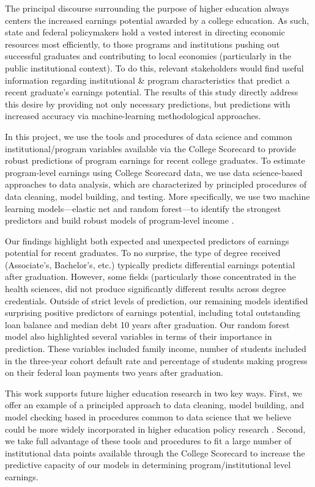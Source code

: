 \documentclass[a4paper, 12pt]{article}
\begin{document}
The principal discourse surrounding the purpose of higher education always centers the increased earnings potential awarded by a college education. As such, state and federal policymakers hold a vested interest in directing economic resources most efficiently, to those programs and institutions pushing out successful graduates and contributing to local economies (particularly in the public institutional context). To do this, relevant stakeholders would find useful information regarding institutional \& program characteristics that  predict a recent graduate's earnings potential. The results of this study directly address this desire by providing not only necessary predictions, but predictions with increased accuracy via machine-learning methodological approaches. 

In this project, we use the tools and procedures of data science and common institutional/program variables available via the College Scorecard to provide robust predictions of program earnings for recent college graduates. To estimate program-level earnings using College Scorecard data, we use data science-based approaches to data analysis, which are characterized by principled procedures of data cleaning, model building, and testing. More specifically, we use two machine learning models---elastic net and random forest---to identify the strongest predictors and build robust models of program-level income \parencite{Hastie_etal_2016, Kuhn_Silge_2022}.

Our findings highlight both expected and unexpected predictors of earnings potential for recent graduates. To no surprise, the type of degree received (Associate's, Bachelor's, etc.) typically predicts differential earnings potential after graduation. However, some fields (particularly those concentrated in the health sciences, did not produce significantly different results across degree credentials. Outside of strict levels of prediction, our remaining models identified surprising positive predictors of earnings potential, including total outstanding loan balance and median debt 10 years after graduation. Our random forest model also highlighted several variables in terms of their importance in prediction. These variables included family income, number of students included in the three-year cohort default rate and percentage of students making progress on their federal loan payments two years after graduation.

This work supports future higher education research in two key ways. First, we offer an example of a principled approach to data cleaning, model building, and model checking based in procedures common to data science that we believe could be more widely incorporated in higher education policy research \parencite{Kuhn_Silge_2022}. Second, we take full advantage of these tools and procedures to fit a large number of institutional data points available through the College Scorecard to increase the predictive capacity of our models in determining program/institutional level earnings.
\end{document}
